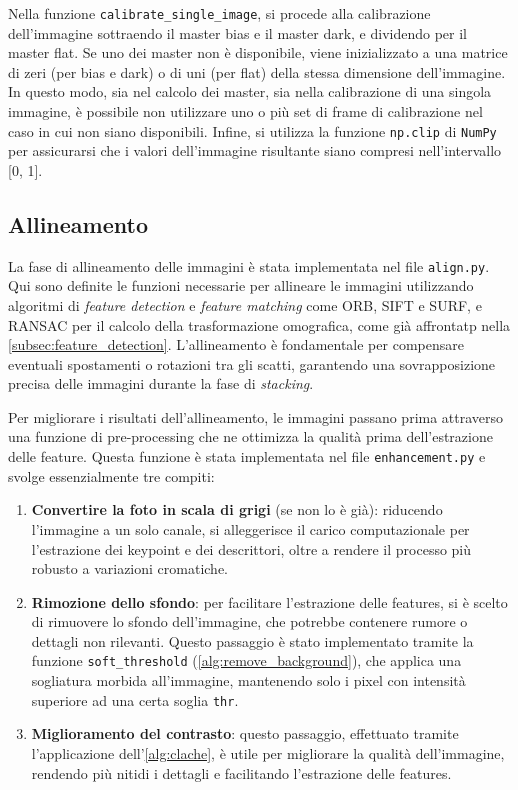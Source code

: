 Nella funzione \texttt{calibrate\_single\_image}, si procede alla calibrazione dell'immagine sottraendo il master bias e il master dark, e dividendo per il master flat. Se uno dei master non è disponibile, viene inizializzato a una matrice di zeri (per bias e dark) o di uni (per flat) della stessa dimensione dell'immagine. In questo modo, sia nel calcolo dei master, sia nella calibrazione di una singola immagine, è possibile non utilizzare uno o più set di frame di calibrazione nel caso in cui non siano disponibili. Infine, si utilizza la funzione \texttt{np.clip} di \texttt{NumPy} per assicurarsi che i valori dell'immagine risultante siano compresi nell'intervallo [0, 1].

\subsection{Allineamento} \label{subsec:alignment_impl}

La fase di allineamento delle immagini è stata implementata nel file \texttt{align.py}. Qui sono definite le funzioni necessarie per allineare le immagini utilizzando algoritmi di \textit{feature detection} e \textit{feature matching} come ORB, SIFT e SURF, e RANSAC per il calcolo della trasformazione omografica, come già affrontatp nella \cref{subsec:feature_detection}. L'allineamento è fondamentale per compensare eventuali spostamenti o rotazioni tra gli scatti, garantendo una sovrapposizione precisa delle immagini durante la fase di \textit{stacking}.

Per migliorare i risultati dell'allineamento, le immagini passano prima attraverso una funzione di pre-processing che ne ottimizza la qualità prima dell'estrazione delle feature. Questa funzione è stata implementata nel file \texttt{enhancement.py} e svolge essenzialmente tre compiti:

\begin{enumerate}
    \item \textbf{Convertire la foto in scala di grigi} (se non lo è già): riducendo l'immagine a un solo canale, si alleggerisce il carico computazionale per l'estrazione dei keypoint e dei descrittori, oltre a rendere il processo più robusto a variazioni cromatiche.
    
    \item \textbf{Rimozione dello sfondo}: per facilitare l'estrazione delle features, si è scelto di rimuovere lo sfondo dell'immagine, che potrebbe contenere rumore o dettagli non rilevanti. Questo passaggio è stato implementato tramite la funzione \texttt{soft\_threshold} (\cref{alg:remove_background}), che applica una sogliatura morbida all'immagine, mantenendo solo i pixel con intensità superiore ad una certa soglia \texttt{thr}.
    
    \item \textbf{Miglioramento del contrasto}: questo passaggio, effettuato tramite l'applicazione dell'\cref{alg:clache}, è utile per migliorare la qualità dell'immagine, rendendo più nitidi i dettagli e facilitando l'estrazione delle features.
\end{enumerate}


